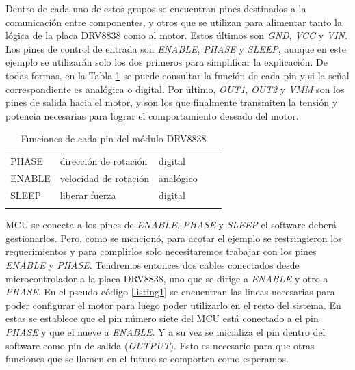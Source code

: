 Dentro de cada uno de estos grupos se encuentran pines destinados a la comunicación entre componentes, y otros que se utilizan para alimentar tanto la lógica de la placa \gls{DRV8838} como al motor. Estos últimos son \textit{GND}, \textit{VCC} y \textit{VIN}. Los pines de control de entrada son \textit{ENABLE}, \textit{PHASE} y \textit{SLEEP}, aunque en este ejemplo se utilizarán solo los dos primeros para simplificar la explicación. De todas formas, en la Tabla \ref{funciones_pin_drv8838} se puede consultar la función de cada pin y si la señal correspondiente es analógica o digital. Por último, \textit{OUT1}, \textit{OUT2} y \textit{VMM} son los pines de salida hacia el motor, y son los que finalmente transmiten la tensión y potencia necesarias para lograr el comportamiento deseado del motor.

\begin{table}[h]
\centering
\begin{tabular}{lllll}
\cline{1-3}
\multicolumn{1}{|l|}{PHASE}  & \multicolumn{1}{l|}{dirección de rotación} & \multicolumn{1}{l|}{digital}   &  &  \\ \cline{1-3}
\multicolumn{1}{|l|}{ENABLE} & \multicolumn{1}{l|}{velocidad de rotación} & \multicolumn{1}{l|}{analógico} &  &  \\ \cline{1-3}
\multicolumn{1}{|l|}{SLEEP}  & \multicolumn{1}{l|}{liberar fuerza}        & \multicolumn{1}{l|}{digital}   &  &  \\ \cline{1-3}
                             &                                            &                                &  & 
\end{tabular}
\caption{Funciones de cada pin del módulo DRV8838}
\label{funciones_pin_drv8838}
\end{table}

\gls{MCU} se conecta a los pines de \textit{ENABLE}, \textit{PHASE} y \textit{SLEEP} el software deberá gestionarlos. Pero, como se mencionó, para acotar el ejemplo se restringieron los requerimientos y para complirlos solo necesitaremos trabajar con los pines \textit{ENABLE} y \textit{PHASE}. Tendremos entonces dos cables conectados desde \gls{microcontrolador} a la placa \gls{DRV8838}, uno que se dirige a \textit{ENABLE} y otro a \textit{PHASE}. En el pseudo-código \ref{listing1} se encuentran las lineas necesarias para poder configurar el motor para luego poder utilizarlo en el resto del sistema. En estas se establece que el pin número siete del \gls{MCU} está conectado a el pin \textit{PHASE} y que el nueve a \textit{ENABLE}. Y a su vez se inicializa el pin dentro del software como pin de salida (\textit{OUTPUT}). Esto es necesario para que otras funciones que se llamen en el futuro se comporten como esperamos.

